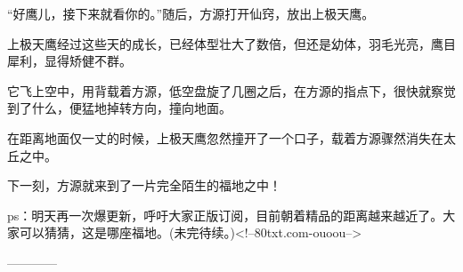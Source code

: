 \begin{this_body}
“好鹰儿，接下来就看你的。”随后，方源打开仙窍，放出上极天鹰。

上极天鹰经过这些天的成长，已经体型壮大了数倍，但还是幼体，羽毛光亮，鹰目犀利，显得矫健不群。

它飞上空中，用背载着方源，低空盘旋了几圈之后，在方源的指点下，很快就察觉到了什么，便猛地掉转方向，撞向地面。

在距离地面仅一丈的时候，上极天鹰忽然撞开了一个口子，载着方源骤然消失在太丘之中。

下一刻，方源就来到了一片完全陌生的福地之中！

ps：明天再一次爆更新，呼吁大家正版订阅，目前朝着精品的距离越来越近了。大家可以猜猜，这是哪座福地。(未完待续。)<!--80txt.com-ouoou-->

------------

\end{this_body}

